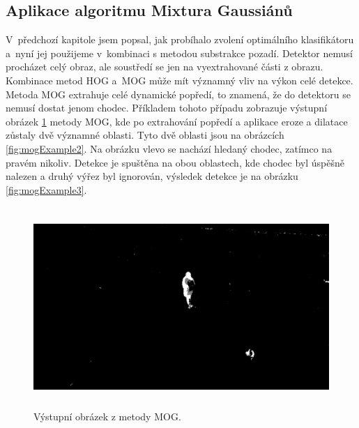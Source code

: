 \subsection{Aplikace algoritmu Mixtura Gaussiánů}
V~předchozí kapitole jsem popsal, jak probíhalo zvolení optimálního klasifikátoru a~nyní jej použijeme v~kombinaci s metodou substrakce pozadí.
Detektor nemusí procházet celý obraz, ale soustředí se jen na vyextrahované části z obrazu. Kombinace metod HOG a~MOG může mít významný vliv na výkon celé detekce. Metoda MOG extrahuje celé dynamické popředí, to znamená, že do detektoru se nemusí dostat jenom chodec. Příkladem tohoto případu zobrazuje výstupní obrázek \ref{fig:mogExample1} metody MOG, kde po extrahování popředí a aplikace eroze a dilatace zůstaly dvě významné oblasti. Tyto dvě oblasti jsou na obrázcích \ref{fig:mogExample2}. Na obrázku vlevo se nachází hledaný chodec, zatímco na pravém nikoliv. Detekce je spuštěna na obou oblastech, kde chodec byl úspěšně nalezen a druhý výřez byl ignorován, výsledek detekce je na obrázku \ref{fig:mogExample3}.
\begin{figure}[H]
\centering
\includegraphics[keepaspectratio, max height=7.6cm,]{figures/mog/mog}%
\caption{Výstupní obrázek z metody MOG.}
\label{fig:mogExample1}
\end{figure}
